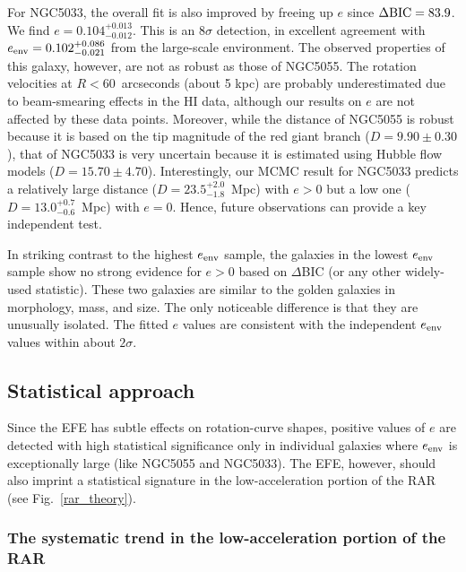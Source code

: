 \documentclass[twocolumn,tighten]{aastex63}
\begin{document}
For NGC5033, the overall fit is also improved by freeing up $e$ since $\Delta{\rm BIC}=83.9$. We find $e=0.104_{-0.012}^{+0.013}$. This is an $8\sigma$ detection, in excellent agreement with $e_{\rm env}=0.102_{-0.021}^{+0.086}$ from the large-scale environment. The observed properties of this galaxy, however, are not as robust as those of NGC5055. The rotation velocities at $R<60$~arcseconds (about 5 kpc) are probably underestimated due to beam-smearing effects in the HI data, although our results on $e$ are not affected by these data points. Moreover, while the distance of NGC5055 is robust because it is based on the tip magnitude of the red giant branch ($D=9.90\pm0.30$), that of NGC5033 is very uncertain because it is estimated using Hubble flow models ($D = 15.70  \pm 4.70$). Interestingly, our MCMC result for NGC5033 predicts a relatively large distance ($D=23.5^{+2.0}_{-1.8}$~Mpc) with $e>0$ but a low one ($D=13.0^{+0.7}_{-0.6}$~Mpc) with $e=0$. Hence, future observations can provide a key independent test.

In striking contrast to the highest $e_{\rm env}$ sample, the galaxies in the lowest $e_{\rm env}$ sample show no strong evidence for $e > 0$ based on $\Delta$BIC (or any other widely-used statistic). These two galaxies are similar to the golden galaxies in morphology, mass, and size. The only noticeable difference is that they are unusually isolated. The fitted $e$ values are consistent with the independent $e_{\rm env}$ values within about $2\sigma$.

\subsection{Statistical approach}  \label{sec:res_stat}

Since the EFE has subtle effects on rotation-curve shapes, positive values of $e$ are detected with high statistical significance only in individual galaxies where $e_{\rm env}$ is exceptionally large (like NGC5055 and NGC5033). The EFE, however, should also imprint a statistical signature in the low-acceleration portion of the RAR (see Fig.~\ref{rar_theory}).

\subsubsection{The systematic trend in the low-acceleration portion of the RAR} \label{sec:rardev}
\end{document}
